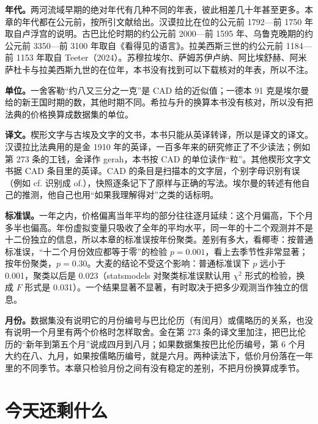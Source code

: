 \begin{deeper}
\textbf{年代。}两河流域早期的绝对年代有几种不同的年表，彼此相差几十年甚至更多。本章的年代都在公元前，按所引文献给出。汉谟拉比在位的公元前 1792—前 1750 年取自卢浮宫的说明。古巴比伦时期的约公元前 2000—前 1595 年、乌鲁克晚期的约公元前 3350—前 3100 年取自《看得见的语言》。拉美西斯三世的约公元前 1184—前 1153 年取自 Teeter（2024）。苏穆拉埃尔、萨姆苏伊卢纳、阿比埃舒赫、阿米萨杜卡与拉美西斯九世的在位年，本书没有找到可以下载核对的年表，所以不注。

\textbf{单位。}一舍客勒“约八又三分之一克”是 CAD 给的近似值；一德本 91 克是埃尔曼给的新王国时期的数，其他时期不同。希拉与升的换算本书没有核对，所以没有把法典的价格换算成数据集的单位。

\textbf{译文。}楔形文字与古埃及文字的文书，本书只能从英译转译，所以是译文的译文。汉谟拉比法典用的是金 1910 年的英译，一百多年来的研究修正了不少读法；例如第 273 条的工钱，金译作 gerah，本书按 CAD 的单位读作“粒”。其他楔形文字文书据 CAD 条目里的英译。CAD 的条目是扫描本的文字层，个别字母识别有误（例如 cf. 识别成 of.），快照逐条记下了原样与正确的写法。埃尔曼的转述有他自己的推测，他自己也用“如果我理解得对”之类的话标明。

\textbf{标准误。}一年之内，价格偏离当年平均的部分往往逐月延续：这个月偏高，下个月多半也偏高。年份虚拟变量只吸收了全年的平均水平，同一年的十二个观测并不是十二份独立的信息，所以本章的标准误按年份聚类。差别有多大，看椰枣：按普通标准误，“十二个月份效应都等于零”的检验 $p=0.001$，看上去季节性非常显著；按年份聚类，$p=0.30$。大麦的结论不受这个影响：普通标准误下 $p$ 远小于 0.001，聚类以后是 0.023（statsmodels 对聚类标准误默认用 $\chi^2$ 形式的检验，换成 $F$ 形式是 0.031）。一个结果显著不显著，有时取决于把多少观测当作独立的信息。

\textbf{月份。}数据集没有说明它的月份编号与巴比伦历（有闰月）或儒略历的关系，也没有说明一个月里有两个价格时怎样取舍。金在第 273 条的译文里加注，把巴比伦历的“新年到第五个月”说成四月到八月\cite{king1910}；如果数据集按巴比伦历编号，第 6 个月大约在八、九月，如果按儒略历编号，就是六月。两种读法下，低价月份落在一年里的不同季节。本章只检验月份之间有没有稳定的差别，不把月份换算成季节。
\end{deeper}

\section{今天还剩什么}\label{sec:meso-legacy}

